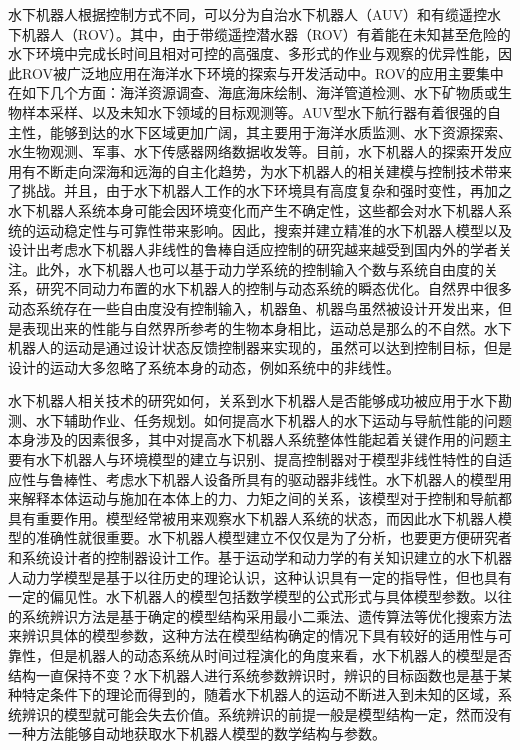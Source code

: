 水下机器人根据控制方式不同，可以分为自治水下机器人（AUV）和有缆遥控水下机器人（ROV）。其中，由于带缆遥控潜水器（ROV）有着能在未知甚至危险的水下环境中完成长时间且相对可控的高强度、多形式的作业与观察的优异性能，因此ROV被广泛地应用在海洋水下环境的探索与开发活动中。ROV的应用主要集中在如下几个方面：海洋资源调查、海底海床绘制、海洋管道检测、水下矿物质或生物样本采样、以及未知水下领域的目标观测等\cite{follestad2017autonomous,aguiar2007dynamic}。AUV型水下航行器有着很强的自主性，能够到达的水下区域更加广阔，其主要用于海洋水质监测、水下资源探索、水生物观测、军事、水下传感器网络数据收发等\cite{maalouf2013contribution}。目前，水下机器人的探索开发应用有不断走向深海和远海的自主化趋势，为水下机器人的相关建模与控制技术带来了挑战\cite{wangbiao2016,yangke2014,yangrui2015,aakre2016development}。并且，由于水下机器人工作的水下环境具有高度复杂和强时变性，再加之水下机器人系统本身可能会因环境变化而产生不确定性，这些都会对水下机器人系统的运动稳定性与可靠性带来影响。因此，搜索并建立精准的水下机器人模型以及设计出考虑水下机器人非线性的鲁棒自适应控制的研究越来越受到国内外的学者关注\cite{yang2014modeling,haugen2012modeling,knausgaard2013development,eidsvik2015identification,eng2014added}。此外，水下机器人也可以基于动力学系统的控制输入个数与系统自由度的关系，研究不同动力布置的水下机器人的控制与动态系统的瞬态优化\cite{fantoni2002non,russdrakebook}。自然界中很多动态系统存在一些自由度没有控制输入，机器鱼、机器鸟虽然被设计开发出来，但是表现出来的性能与自然界所参考的生物本身相比，运动总是那么的不自然\cite{russdrakebook}。水下机器人的运动是通过设计状态反馈控制器来实现的，虽然可以达到控制目标，但是设计的运动大多忽略了系统本身的动态，例如系统中的非线性\cite{russdrakebook,galeani2009tutorial}。

水下机器人相关技术的研究如何，关系到水下机器人是否能够成功被应用于水下勘测、水下辅助作业、任务规划\cite{Souza2007Intelligent}。如何提高水下机器人的水下运动与导航性能的问题本身涉及的因素很多，其中对提高水下机器人系统整体性能起着关键作用的问题主要有水下机器人与环境模型的建立与识别、提高控制器对于模型非线性特性的自适应性与鲁棒性、考虑水下机器人设备所具有的驱动器非线性\cite{yang2012observer,sarhadi2016adaptive2}。水下机器人的模型用来解释本体运动与施加在本体上的力、力矩之间的关系，该模型对于控制和导航都具有重要作用\cite{wu2016parametric}。模型经常被用来观察水下机器人系统的状态，而因此水下机器人模型的准确性就很重要。水下机器人模型建立不仅仅是为了分析，也要更方便研究者和系统设计者的控制器设计工作。基于运动学和动力学的有关知识建立的水下机器人动力学模型是基于以往历史的理论认识，这种认识具有一定的指导性，但也具有一定的偏见性\cite{menezes2014symbolic}。水下机器人的模型包括数学模型的公式形式与具体模型参数\cite{schmidt2009distilling}。以往的系统辨识方法是基于确定的模型结构采用最小二乘法、遗传算法等优化搜索方法来辨识具体的模型参数，这种方法在模型结构确定的情况下具有较好的适用性与可靠性，但是机器人的动态系统从时间过程演化的角度来看，水下机器人的模型是否结构一直保持不变\cite{John1978Methods}？水下机器人进行系统参数辨识时，辨识的目标函数也是基于某种特定条件下的理论而得到的，随着水下机器人的运动不断进入到未知的区域，系统辨识的模型就可能会失去价值。系统辨识的前提一般是模型结构一定，然而没有一种方法能够自动地获取水下机器人模型的数学结构与参数\cite{wu2016parametric}。

